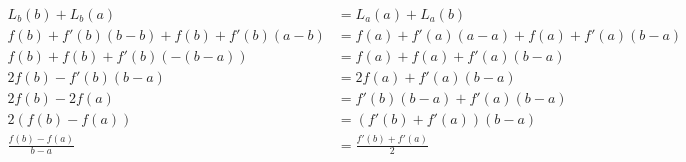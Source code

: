 \documentclass[11pt]{article}
\begin{document}
\parindent=0pt


\begin{align*}
L_b(b)+ L_b(a) & = L_a(a) + L_a(b)\\
f(b)+f'(b)(b-b)+f(b)+f'(b)(a-b) & =  f(a)+f'(a)(a-a)+f(a)+f'(a)(b-a)\\
f(b)+f(b)+f'(b)(-(b-a)) & = f(a)+f(a)+f'(a)(b-a)\\
2f(b)-f'(b)(b-a)  &= 2f(a)+ f'(a)(b-a)\\
2f(b) - 2f(a) &= f'(b)(b-a) + f'(a)(b-a)\\
2(f(b) - f(a)) &= (f'(b) + f'(a))(b-a)\\
\frac{f(b)-f(a)}{b-a} &= \frac{f'(b)+f'(a)}{2}
\end{align*}
\end{document}
